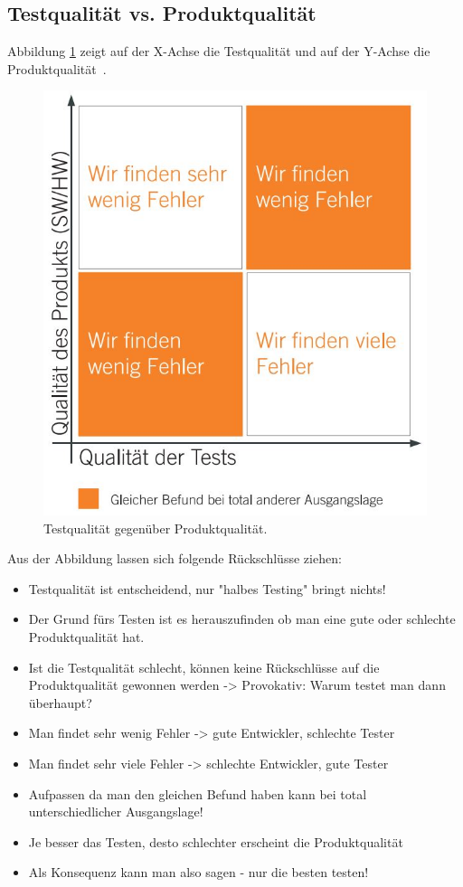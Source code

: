 \subsection{Testqualität vs. Produktqualität}
Abbildung \ref{fig: Testqualität vs. Produktqualität} zeigt auf der X-Achse die Testqualität und auf der Y-Achse die Produktqualität~\cite{theNoserWayOfTesting}.

\begin{figure}[H]
	\centering
	\includegraphics[width=0.6\columnwidth]{01/bilder/Testqualität vs Produktqualität.JPG}
	\caption{Testqualität gegenüber Produktqualität.}
	\label{fig: Testqualität vs. Produktqualität}
\end{figure}

Aus der Abbildung lassen sich folgende Rückschlüsse ziehen:
\begin{itemize}
    \item Testqualität ist entscheidend, nur "halbes Testing" bringt nichts!
    \item Der Grund fürs Testen ist es herauszufinden ob man eine gute oder schlechte Produktqualität hat.
    \item Ist die Testqualität schlecht, können keine Rückschlüsse auf die Produktqualität gewonnen werden -> Provokativ: Warum testet man dann überhaupt?
    \item Man findet sehr wenig Fehler -> gute Entwickler, schlechte Tester
    \item Man findet sehr viele Fehler -> schlechte Entwickler, gute Tester
    \item Aufpassen da man den gleichen Befund haben kann bei total unterschiedlicher Ausgangslage!
    \item Je besser das Testen, desto schlechter erscheint die Produktqualität
    \item Als Konsequenz kann man also sagen - nur die besten testen!
\end{itemize}


